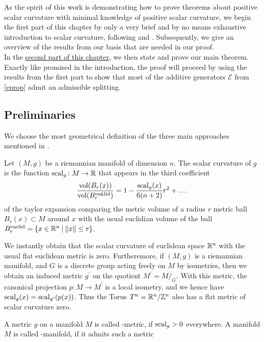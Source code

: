 As the spirit of this work is demonstrating how to prove theorems about positive scalar curvature with minimal knowledge of positive scalar curvature, we begin the first part of this chapter by only a very brief and by no means exhaustive introduction to scalar curvature, following \cite{stolz:survey} and \cite{carl:survey}.
Subsequently, we give an overview of the results from our basis \cite{ew:psc} that are needed in our proof.\\
In the \hyperlink{subsection.3.2}{second part of this chapter}, we then state and prove our main theorem.
Exactly like promised in the introduction, the proof will proceed by using the results from the first part to show that most of the additive generators $\mathcal{E}$ from \ref{eprop} admit an admissible splitting.
\subsection{Preliminaries}
We choose the most geometrical definition of the three main approaches mentioned in \cite{carl:survey}.
\begin{defi}
Let $(M,g)$ be a riemannian manifold of dimension $n$. 
The scalar curvature of $g$ is the function $\mathrm{scal}_g\colon M\to \mathbb{R}$ that appears in the third coefficient
\begin{equation*}
    \frac{\mathrm{vol}(B_r(x))}{\mathrm{vol}(B_r^{\text{euklid}})} = 1 - \frac{\mathrm{scal}_g(x)}{6(n+2)}r^2 + \dots
\end{equation*}
    of the taylor expansion comparing the metric volume of a radius $r$ metric ball $B_r(x)\subset M$ around $x$ with the usual euclidian volume of the ball $B_r^{\text{euclid}} = \{x \in \mathbb{R}^n \:\vert\: \lVert x \rVert \leq r\}$.
\end{defi}
We instantly obtain that the scalar curvature of euclidean space $\mathbb{R}^n$ with the usual flat euclidean metric is zero.
Furtheremore, if $(M,g)$ is a riemannian manifold, and $G$ is a discrete group acting freely on $M$ by isometries, then we obtain an induced metric $g^\prime$ on the quotient $M^\prime = M/_G$.
With this metric, the canonical projection $p\colon M\to M^\prime$ is a local isometry, and we hence have $\mathrm{scal}_g(x) = \mathrm{scal}_{g^\prime}(p(x))$.
Thus the Torus $T^n = \mathbb{R}^n/\mathbb{Z}^n$ also has a flat metric of scalar curvature zero.
\begin{defi}[\psc]
    A metric $g$ on a manifold $M$ is called \psc-metric, if $\mathrm{scal}_g > 0$ everywhere. A manifold $M$ is called \psc-manifold, if it admits such a metric
\end{defi}
